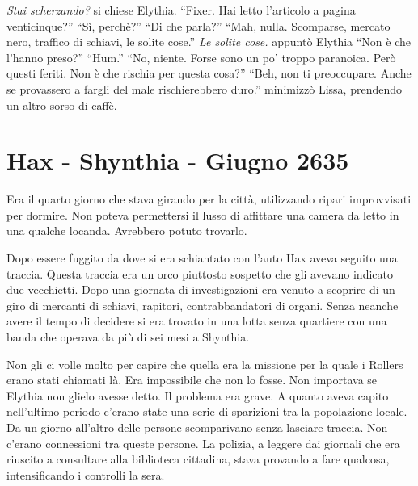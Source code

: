     \emph{Stai scherzando?} si chiese Elythia. ``Fixer. Hai letto
    l'articolo a pagina venticinque?'' ``Sì, perchè?'' ``Di che parla?''
    ``Mah, nulla. Scomparse, mercato nero, traffico di schiavi, le solite
    cose.'' \emph{Le solite cose.} appuntò Elythia ``Non è che l'hanno
    preso?'' ``Hum.'' ``No, niente. Forse sono un po' troppo paranoica.
    Però questi feriti. Non è che rischia per questa cosa?'' ``Beh, non ti
    preoccupare. Anche se provassero a fargli del male rischierebbero
    duro.'' minimizzò Lissa, prendendo un altro sorso di caffè.

    \section{Hax - Shynthia - Giugno 2635}
    Era il quarto giorno che stava girando per la città, utilizzando ripari
    improvvisati per dormire. Non poteva permettersi il lusso di affittare
    una camera da letto in una qualche locanda. Avrebbero potuto trovarlo.

    Dopo essere fuggito da dove si era schiantato con l'auto Hax aveva
    seguito una traccia. Questa traccia era un orco piuttosto sospetto che
    gli avevano indicato due vecchietti. Dopo una giornata di
    investigazioni era venuto a scoprire di un giro di mercanti di schiavi,
    rapitori, contrabbandatori di organi. Senza neanche avere il tempo di
    decidere si era trovato in una lotta senza quartiere con una banda che
    operava da più di sei mesi a Shynthia.

    Non gli ci volle molto per capire che quella era la missione per la
    quale i Rollers erano stati chiamati là. Era impossibile che non lo
    fosse. Non importava se Elythia non glielo avesse detto. Il problema
    era grave. A quanto aveva capito nell'ultimo periodo c'erano state una
    serie di sparizioni tra la popolazione locale. Da un giorno all'altro
    delle persone scomparivano senza lasciare traccia. Non c'erano
    connessioni tra queste persone. La polizia, a leggere dai giornali che
    era riuscito a consultare alla biblioteca cittadina, stava provando a
    fare qualcosa, intensificando i controlli la sera.
    
